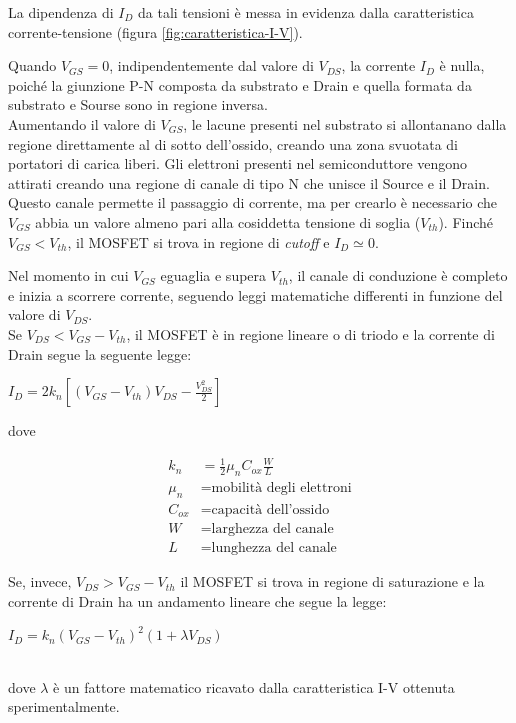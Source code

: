 La dipendenza di $I_D$ da tali tensioni è messa in evidenza dalla caratteristica corrente-tensione (figura \ref{fig:caratteristica-I-V}).

Quando $V_{GS} = 0$, indipendentemente dal valore di $V_{DS}$, la corrente $I_D$ è nulla, poiché la giunzione P-N composta da substrato e Drain e quella formata da substrato e Sourse sono in regione inversa. \\
Aumentando il valore di $V_{GS}$, le lacune presenti nel substrato si allontanano dalla regione direttamente al di sotto dell'ossido, creando una
zona svuotata di portatori di carica liberi. Gli elettroni presenti nel semiconduttore
vengono attirati creando una regione di canale di tipo N che unisce il
Source e il Drain. Questo canale permette il passaggio di corrente, ma per crearlo è necessario che $V_{GS}$ abbia un valore almeno pari alla cosiddetta tensione di soglia ($V_{th}$). Finché $V_{GS} < V_{th}$, il MOSFET si trova in regione di \emph{cutoff} e $I_D \simeq 0$.

Nel momento in cui $V_{GS}$ eguaglia e supera $V_{th}$, il canale di conduzione è completo e inizia a scorrere corrente, seguendo leggi matematiche differenti in funzione del valore di $V_{DS}$.\\

Se $V_{DS} < V_{GS} -  V_{th}$, il MOSFET è in regione lineare o di triodo e la corrente di Drain segue la seguente legge:\\
\centerline{ $I_D = 2k_n\left[ \left(V_{GS}-V_{th}\right)V_{DS} - \frac{V_{DS}^2}{2}\right]$}

dove

\begin{align*}
   k_n &= \frac{1}{2}\mu_n C_{ox}\frac{W}{L} \\
   \mu_n &= \text{mobilità degli elettroni} \\
   C_{ox} &= \text{capacità dell'ossido} \\
   W &= \text{larghezza del canale} \\
   L &= \text{lunghezza del canale}
\end{align*}

Se, invece, $V_{DS} > V_{GS} -  V_{th}$ il MOSFET si trova in regione di saturazione e la corrente di Drain ha un andamento lineare che segue la legge:\\
\centerline{ $I_D = k_n\left(V_{GS}-V_{th}\right)^2 (1+\lambda V_{DS})$}\\
dove $\lambda$ è un fattore matematico ricavato dalla caratteristica I-V ottenuta sperimentalmente.\\

